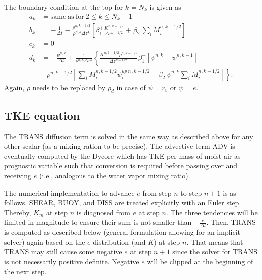 \documentclass[dvipdfmx,a4paper,10pt]{article}
\begin{document}
The boundary condition at the top for $k=N_k$ is given as
\begin{align*}
  a_k &= \mathrm{same~as~for~}2\leq k \leq N_k-1  \\
    b_k &= -\frac{1}{\Delta t} - \frac{\rho^{n,k-1/2}}{\rho^{n,k}\Delta z^k} \left[\beta_1^+\frac{K^{n,k-1/2}}{\Delta z ^{k-1/2}}+\beta_2^+\sum_iM_i^{n,k-1/2} \right] \\
      c_k &= 0 \\
      d_k &= -\frac{\psi^{n,k}}{\Delta t} + \frac{1}{\rho^{n,k}\Delta z^k} \left\{ \frac{K^{n,k-1/2}\rho^{n,k-1/2}}{\Delta z^{k-1/2}}\beta_1^{-}\left[\psi^{n,k} - \psi^{n,k-1}\right]\right.   \\   
          & \left.-\rho^{n,k-1/2}\left[\sum_iM_i^{n,k-1/2}\psi_i^{up~n,k-1/2} -\beta_2^{-}\psi^{n,k}\sum_iM_i^{n,k-1/2} \right]\right\}.    
\end{align*}
Again, $\rho$ needs to be replaced by $\rho_d$ in case of $\psi=r_v$ or $\psi=e$. 

\subsection{TKE equation}

The TRANS diffusion term is solved in the same way as described above for any other scalar (as a mixing ration to be precise). The advective term ADV is eventually computed by the Dycore which has TKE per mass of moist air as prognostic variable such that conversion is required before passing over and receiving $e$ (i.e., analogous to the water vapor mixing ratio). 

The numerical implementation to advance $e$ from step $n$ to step $n+1$ is as follows. SHEAR, BUOY, and DISS are treated explicitly with an Euler step. Thereby, $K_m$ at step $n$ is diagnosed from $e$ at step $n$. The three tendencies will be limited in magnitude to ensure their sum is not smaller than $-\frac{e}{\Delta t}$. Then, TRANS is computed as described below (general formulation allowing for an implicit solver) again based on the $e$ distribution (and $K$) at step $n$. That means that TRANS may still cause some negative $e$ at step $n+1$ since the solver for TRANS is not necessarily positive definite. Negative $e$ will be clipped at the beginning of the next step. 
\end{document}
